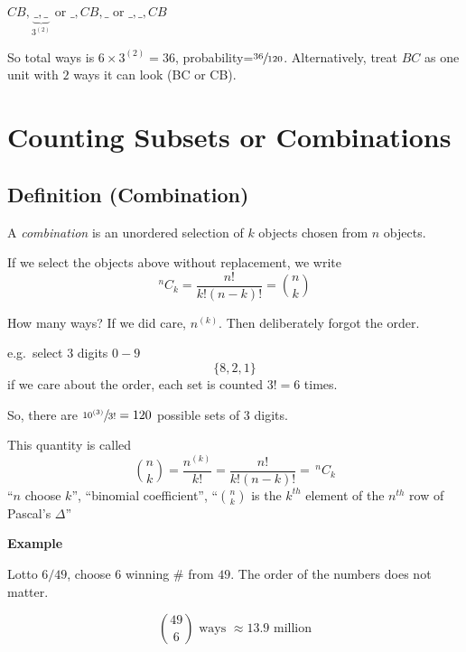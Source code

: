 $ CB,\underbrace{\_,\_}_{3^{(2)}} $ or $ \_,CB,\_ $ or $ \_,\_,CB $

So total ways is $ 6\times 3^{(2)}=36 $, probability=$ \sfrac{36}{120} $.
Alternatively, treat $ BC $ as one unit with $ 2 $ ways it can look
(BC or CB).

\section{Counting Subsets or Combinations}

\begin{defbox}
    \subsection{Definition (Combination)}
    A \emph{combination} is an unordered selection of $ k $
    objects chosen from $ n $ objects.

    If we select the objects above without replacement, we write
    \[ ^n C_k=\frac{n!}{k!(n-k)!}=\binom{n}{k} \]
\end{defbox}

How many ways? If we did care, $ n^{(k)} $. Then deliberately forgot the order.

e.g.\ select $ 3 $ digits $ 0-9 $
\[ \{8,2,1\} \]
if we care about the order, each set is counted $ 3!=6 $ times.

So, there are $ \sfrac{10^{(3)}}{3!}=120 $ possible sets of $ 3 $ digits.

This quantity is called
\[ \binom{n}{k}=\frac{n^{(k)}}{k!}=\frac{n!}{k!(n-k)!}=\, ^n C_k \]
``$ n $ choose $ k $'', ``binomial coefficient'',
``$ \binom{n}{k} $ is the $ k^{th} $ element of the $ n^{th} $ row of Pascal's
$ \Delta $''

\textbf{Example}

Lotto $ 6/49 $, choose $ 6 $ winning \# from $ 49 $. The order of the numbers
does not matter.

\[ \binom{49}{6}\text{ ways }\approx 13.9 \text{ million} \]

